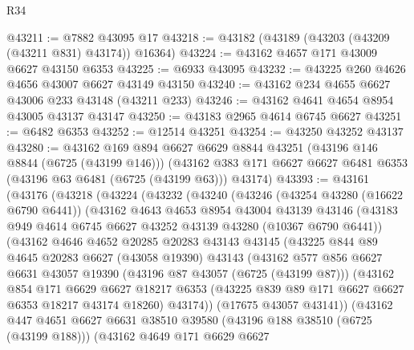 \begin{lexlean}{R34}
\begin{coremodule}
@43211 := @7882 @43095 @17
@43218 := @43182 (@43189 (@43203 (@43209 (@43211 @831) @43174)) @16364)
@43224 := @43162 @4657 @171 @43009 @6627 @43150 @6353
@43225 := @6933 @43095
@43232 := @43225 @260 @4626 @4656 @43007 @6627 @43149 @43150
@43240 := @43162 @234 @4655 @6627 @43006 @233 @43148 (@43211 @233)
@43246 := @43162 @4641 @4654 @8954 @43005 @43137 @43147
@43250 := @43183 @2965 @4614 @6745 @6627
@43251 := @6482 @6353
@43252 := @12514 @43251
@43254 := @43250 @43252 @43137
@43280 := @43162
    @169
    @894
    @6627
    @6629
    @8844
    @43251
    (@43196 @146 @8844 (@6725 (@43199 @146)))
    (@43162 @383 @171 @6627 @6627 @6481 @6353 (@43196 @63 @6481 (@6725 (@43199 @63))) @43174)
@43393 := @43161
    (@43176
      (@43218
        (@43224
          (@43232
            (@43240
              (@43246
                (@43254 @43280 (@16622 @6790 @6441))
                (@43162
                  @4643
                  @4653
                  @8954
                  @43004
                  @43139
                  @43146
                  (@43183 @949 @4614 @6745 @6627 @43252 @43139 @43280 (@10367 @6790 @6441))
                  (@43162
                    @4646
                    @4652
                    @20285
                    @20283
                    @43143
                    @43145
                    (@43225
                      @844
                      @89
                      @4645
                      @20283
                      @6627
                      (@43058 @19390)
                      @43143
                      (@43162
                        @577
                        @856
                        @6627
                        @6631
                        @43057
                        @19390
                        (@43196 @87 @43057 (@6725 (@43199 @87)))
                        (@43162
                          @854
                          @171
                          @6629
                          @6627
                          @18217
                          @6353
                          (@43225 @839 @89 @171 @6627 @6627 @6353 @18217 @43174 @18260)
                          @43174))
                      (@17675 @43057 @43141))
                    (@43162
                      @447
                      @4651
                      @6627
                      @6631
                      @38510
                      @39580
                      (@43196 @188 @38510 (@6725 (@43199 @188)))
                      (@43162
                        @4649
                        @171
                        @6629
                        @6627

\end{coremodule}
\end{lexlean}
